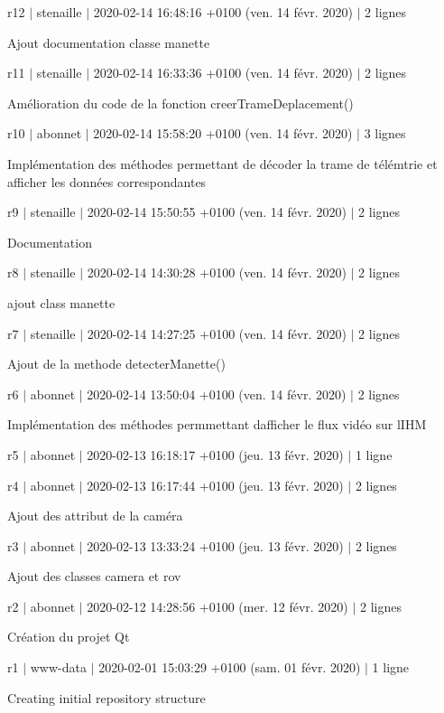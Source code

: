 r12 $\vert$ stenaille $\vert$ 2020-\/02-\/14 16\+:48\+:16 +0100 (ven. 14 févr. 2020) $\vert$ 2 lignes

Ajout documentation classe manette

r11 $\vert$ stenaille $\vert$ 2020-\/02-\/14 16\+:33\+:36 +0100 (ven. 14 févr. 2020) $\vert$ 2 lignes

Amélioration du code de la fonction creer\+Trame\+Deplacement()

r10 $\vert$ abonnet $\vert$ 2020-\/02-\/14 15\+:58\+:20 +0100 (ven. 14 févr. 2020) $\vert$ 3 lignes

Implémentation des méthodes permettant de décoder la trame de télémtrie et afficher les données correspondantes

r9 $\vert$ stenaille $\vert$ 2020-\/02-\/14 15\+:50\+:55 +0100 (ven. 14 févr. 2020) $\vert$ 2 lignes

Documentation

r8 $\vert$ stenaille $\vert$ 2020-\/02-\/14 14\+:30\+:28 +0100 (ven. 14 févr. 2020) $\vert$ 2 lignes

ajout class manette

r7 $\vert$ stenaille $\vert$ 2020-\/02-\/14 14\+:27\+:25 +0100 (ven. 14 févr. 2020) $\vert$ 2 lignes

Ajout de la methode detecter\+Manette()

r6 $\vert$ abonnet $\vert$ 2020-\/02-\/14 13\+:50\+:04 +0100 (ven. 14 févr. 2020) $\vert$ 2 lignes

Implémentation des méthodes permmettant d\textquotesingle{}afficher le flux vidéo sur l\textquotesingle{}I\+HM

r5 $\vert$ abonnet $\vert$ 2020-\/02-\/13 16\+:18\+:17 +0100 (jeu. 13 févr. 2020) $\vert$ 1 ligne

r4 $\vert$ abonnet $\vert$ 2020-\/02-\/13 16\+:17\+:44 +0100 (jeu. 13 févr. 2020) $\vert$ 2 lignes

Ajout des attribut de la caméra

r3 $\vert$ abonnet $\vert$ 2020-\/02-\/13 13\+:33\+:24 +0100 (jeu. 13 févr. 2020) $\vert$ 2 lignes

Ajout des classes camera et rov

r2 $\vert$ abonnet $\vert$ 2020-\/02-\/12 14\+:28\+:56 +0100 (mer. 12 févr. 2020) $\vert$ 2 lignes

Création du projet Qt

r1 $\vert$ www-\/data $\vert$ 2020-\/02-\/01 15\+:03\+:29 +0100 (sam. 01 févr. 2020) $\vert$ 1 ligne

Creating initial repository structure 